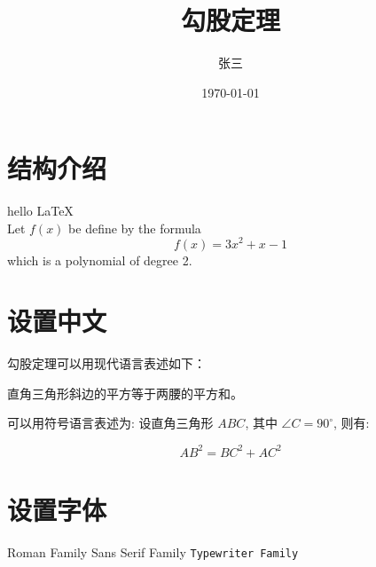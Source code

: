 \documentclass{article} %
\title{\heiti 勾股定理} %
\author{\kaishu 张三}
\date{\today}
\newcommand{\degree}{^\circ} %
\begin{document}
	\maketitle %
	
	\section{结构介绍}
	hello \LaTeX \\ %
	
	Let $f(x)$ be define by the formula $$f(x) = 3x^2 + x - 1$$ 	which is a polynomial of degree 2. \\
	
	
	\section{设置中文}
	

	勾股定理可以用现代语言表述如下：
	
	直角三角形斜边的平方等于两腰的平方和。
	
	可以用符号语言表述为: 设直角三角形 $ABC$, 其中 $\angle C=90\degree$, 则有:
	
	\begin{equation} %
		AB^2 = BC^2 + AC^2
	\end{equation}
	
	
	\section{设置字体}


	
	\textrm{Roman Family} \textsf{Sans Serif Family} \texttt{Typewriter Family}
	
\end{document}
